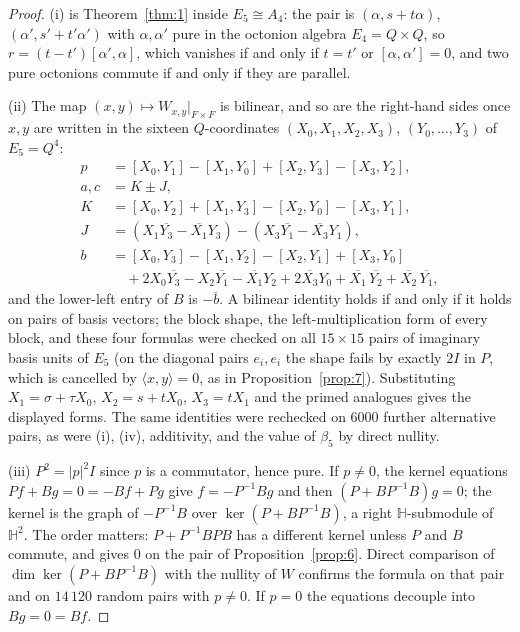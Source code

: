 \documentclass{baustms}
\theoremstyle{cupthm}
\numberwithin{equation}{section}
\newcommand{\HH}{\mathbb{H}}
\begin{document}
\begin{proof}
(i) is Theorem~\ref{thm:1} inside $E_5\cong A_4$: the pair is $(\alpha,s+t\alpha)$, $(\alpha',s'+t'\alpha')$ with $\alpha,\alpha'$ pure in the octonion algebra $E_4=Q\times Q$, so $r=(t-t')[\alpha',\alpha]$, which vanishes if and only if $t=t'$ or $[\alpha,\alpha']=0$, and two pure octonions commute if and only if they are parallel.

(ii) The map $(x,y)\mapsto W_{x,y}|_{F\times F}$ is bilinear, and so are the right-hand sides once $x,y$ are written in the sixteen $Q$-coordinates $(X_0,X_1,X_2,X_3)$, $(Y_0,\ldots,Y_3)$ of $E_5=Q^4$:
\begin{align*}
p&=[X_0,Y_1]-[X_1,Y_0]+[X_2,Y_3]-[X_3,Y_2],\\
a,c&=K\pm J,\\
K&=[X_0,Y_2]+[X_1,Y_3]-[X_2,Y_0]-[X_3,Y_1],\\
J&=(X_1\overline{Y_3}-\overline{X_1}Y_3)-(X_3\overline{Y_1}-\overline{X_3}Y_1),\\
b&=[X_0,Y_3]-[X_1,Y_2]-[X_2,Y_1]+[X_3,Y_0]\\
&\quad+2X_0\overline{Y_3}-X_2\overline{Y_1}-\overline{X_1}Y_2+2\overline{X_3}Y_0+\overline{X_1}\,\overline{Y_2}+\overline{X_2}\,\overline{Y_1},
\end{align*}
and the lower-left entry of $B$ is $-\overline{b}$. A bilinear identity holds if and only if it holds on pairs of basis vectors; the block shape, the left-multiplication form of every block, and these four formulas were checked on all $15\times 15$ pairs of imaginary basis units of $E_5$ (on the diagonal pairs $e_i,e_i$ the shape fails by exactly $2I$ in $P$, which is cancelled by $\langle x,y\rangle=0$, as in Proposition~\ref{prop:7}). Substituting $X_1=\sigma+\tau X_0$, $X_2=s+t X_0$, $X_3=t X_1$ and the primed analogues gives the displayed forms. The same identities were rechecked on $6000$ further alternative pairs, as were (i), (iv), additivity, and the value of $\beta_5$ by direct nullity.

(iii) $P^2=|p|^2 I$ since $p$ is a commutator, hence pure. If $p\neq 0$, the kernel equations $Pf+Bg=0=-Bf+Pg$ give $f=-P^{-1}Bg$ and then $(P+BP^{-1}B)g=0$; the kernel is the graph of $-P^{-1}B$ over $\ker(P+BP^{-1}B)$, a right $\HH$-submodule of $\HH^2$. The order matters: $P+P^{-1}BPB$ has a different kernel unless $P$ and $B$ commute, and gives $0$ on the pair of Proposition~\ref{prop:6}. Direct comparison of $\dim\ker(P+BP^{-1}B)$ with the nullity of $W$ confirms the formula on that pair and on $14\,120$ random pairs with $p\neq 0$. If $p=0$ the equations decouple into $Bg=0=Bf$.


\end{proof}
\end{document}
